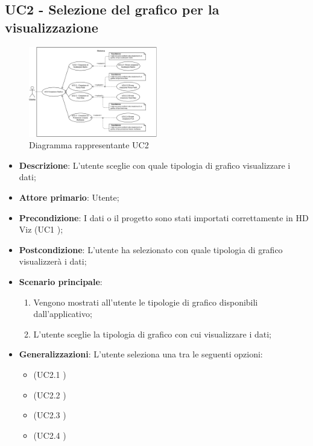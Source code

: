 \subsection{UC2 - Selezione del grafico per la visualizzazione}
\label{sub:uc2}

\begin{figure}[h]
    \centering
    \includegraphics[width=0.5\textwidth]{componenti/casi-duso/diagrammi/UC2.pdf}
    \caption{Diagramma rappresentante UC2}
    \label{fig:UC2}
\end{figure}

\begin{itemize}
	\item \textbf{Descrizione}: L'utente sceglie con quale tipologia di grafico visualizzare i dati;
	\item \textbf{Attore primario}: Utente;
	\item \textbf{Precondizione}: I dati o il progetto sono stati importati correttamente in HD Viz (UC1 );
	\item \textbf{Postcondizione}: L'utente ha selezionato con quale tipologia di grafico visualizzerà i dati;
	\item \textbf{Scenario principale}:
		\begin{enumerate}
			\item Vengono mostrati all'utente le tipologie di grafico disponibili dall'applicativo;
			\item L'utente sceglie la tipologia di grafico con cui visualizzare i dati;
		\end{enumerate}
	\item \textbf{Generalizzazioni}: L'utente seleziona una tra le seguenti opzioni:
		\begin{itemize}
			\item {} (UC2.1 )
			\item {} (UC2.2 )
			\item {} (UC2.3 )
			\item {} (UC2.4 )
		\end{itemize}
\end{itemize}

